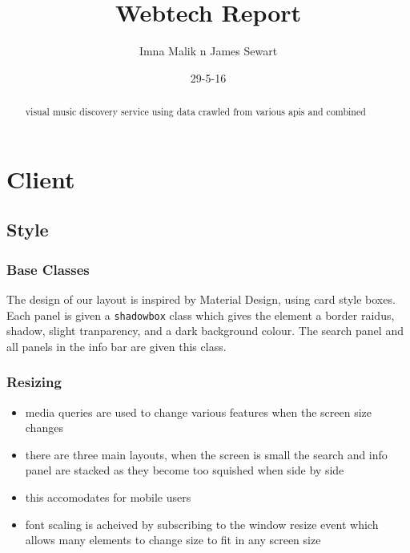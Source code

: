 \documentclass[10pt]{article}
\title{Webtech Report}
\author{Imna Malik n James Sewart}
\date{29-5-16}
\begin{document}
    \maketitle

    \tableofcontents


    \begin{abstract}
        visual music discovery service using data crawled from various apis and combined
    \end{abstract}



    \section{Client}
        \subsection{Style}
            \subsubsection{Base Classes}
                The design of our layout is inspired by Material Design, using card style boxes. Each panel is given a \texttt{shadowbox} class which gives the element a border raidus, shadow, slight tranparency, and a dark background colour. The search panel and all panels in the info bar are given this class.

            \subsubsection{Resizing}
                \begin{itemize}
                    \item media queries are used to change various features when the screen size changes
                    \item there are three main layouts, when the screen is small the search and info panel are stacked as they become too squished when side by side
                    \item this accomodates for mobile users
                    \item font scaling is acheived by subscribing to the window resize event which allows many elements to change size to fit in any screen size
                \end{itemize}
\end{document}
